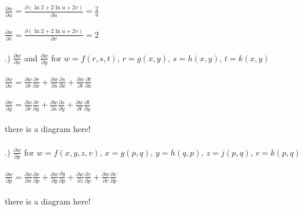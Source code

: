 \documentclass[12pt]{article}
\begin{document}
\noindent $\frac{\partial w}{\partial u} = \frac{\partial (\ln{2} + 2\ln{u} + 2v)}{\partial u} = \frac{2}{u}$\\\\

\noindent $\frac{\partial w}{\partial v} = \frac{\partial (\ln{2} + 2\ln{u} + 2v)}{\partial v} = 2$\\\\


.) $\frac{\partial w}{\partial x}$ and $\frac{\partial w}{\partial y}$ for $w = f(r,s,t)$, \hspace{10pt} $r = g(x,y)$, \hspace{10pt} $s = h(x,y)$, \hspace{10pt} $t = k(x,y)$\\\\

\noindent $\frac{\partial w}{\partial x} = \frac{\partial w}{\partial r}\frac{\partial r}{\partial x} + \frac{\partial w}{\partial s}\frac{\partial s}{\partial x} + \frac{\partial w}{\partial t}\frac{\partial t}{\partial x}$ \\\\






\noindent $\frac{\partial w}{\partial y} = \frac{\partial w}{\partial r}\frac{\partial r}{\partial y} + \frac{\partial w}{\partial s}\frac{\partial s}{\partial y} + \frac{\partial w}{\partial t}\frac{\partial t}{\partial y}$ \\\\
there is a diagram here!\vspace{6cm}\\\\



.) $\frac{\partial w}{\partial p}$ for $w = f(x,y,z,v)$, \hspace{10pt} $x = g(p,q)$, \hspace{10pt} $y = h(q,p)$, \hspace{10pt} $z = j(p,q)$, \hspace{10pt} $v = k(p,q)$\\\\
\noindent $\frac{\partial w}{\partial p} = \frac{\partial w}{\partial x}\frac{\partial x}{\partial p} + \frac{\partial w}{\partial y}\frac{\partial y}{\partial p} + \frac{\partial w}{\partial z}\frac{\partial z}{\partial p} + \frac{\partial w}{\partial v}\frac{\partial v}{\partial p}$\\\\
there is a diagram here!\vspace{10pt}\\\\
\end{document}
